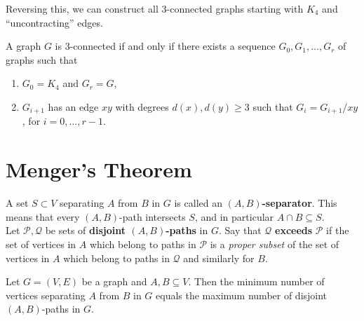 Reversing this, we can construct all 3-connected graphs starting with \(K_4\) and ``uncontracting'' edges.

\begin{theorem}
    A graph \(G\) is 3-connected if and only if there exists a sequence \(G_0, G_1, \dots, G_r\) of graphs such that
    \begin{enumerate}[label=(\roman*)]
        \item \(G_0 = K_4\) and \(G_r = G\),
        \item \(G_{i + 1}\) has an edge \(xy\) with degrees \(d(x), d(y) \geq 3\) such that \(G_i = G_{i + 1}/xy\), for \(i = 0, \dots, r - 1\).
    \end{enumerate}
\end{theorem}

\section{Menger's Theorem}
A set \(S \subset V\) separating \(A\) from \(B\) in \(G\) is called an \textbf{\((A, B)\)-separator}. This means that every \((A, B)\)-path intersects \(S\), and in particular \(A \cap B \subseteq S\). \\

Let \(\mathcal{P}, \mathcal{Q}\) be sets of \textbf{disjoint \((A, B)\)-paths} in \(G\). Say that \(\mathcal{Q}\) \textbf{exceeds} \(\mathcal{P}\) if the set of vertices in \(A\) which belong to paths in \(\mathcal{P}\) is a \textit{proper subset} of the set of vertices in \(A\) which belong to paths in \(\mathcal{Q}\) and similarly for \(B\).

\begin{theorem}
    Let \(G = (V, E)\) be a graph and \(A, B \subseteq V\). Then the minimum number of vertices separating \(A\) from \(B\) in \(G\) equals the maximum number of disjoint \((A, B)\)-paths in \(G\).
\end{theorem}